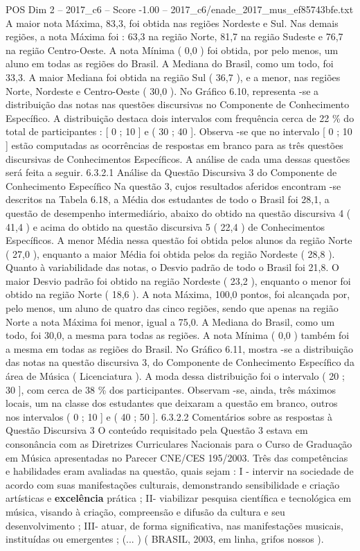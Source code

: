\begin{textsample}{POS Dim 2 – 2017\_c6 – Score -1.00 – 2017\_c6/enade\_2017\_mus\_ef85743bfe.txt}
A maior nota Máxima, 83,3, foi obtida nas regiões Nordeste e Sul.
Nas demais regiões, a nota Máxima foi : 63,3 na região Norte, 81,7 na região Sudeste e 76,7 na região Centro-Oeste.
A nota Mínima ( 0,0 ) foi obtida, por pelo menos, um aluno em todas as regiões do Brasil.
A Mediana do Brasil, como um todo, foi 33,3.
A maior Mediana foi obtida na região Sul ( 36,7 ), e a menor, nas regiões Norte, Nordeste e Centro-Oeste ( 30,0 ).
No Gráfico 6.10, representa -se a distribuição das notas nas questões discursivas no Componente de Conhecimento Específico.
A distribuição destaca dois intervalos com frequência cerca de 22 \% do total de participantes : [ 0 ; 10 ] e ( 30 ; 40 ].
Observa -se que no intervalo [ 0 ; 10 ] estão computadas as ocorrências de respostas em branco para as três questões discursivas de Conhecimentos Específicos.
A análise de cada uma dessas questões será feita a seguir. 6.3.2.1 Análise da Questão Discursiva 3 do Componente de Conhecimento Específico Na questão 3, cujos resultados aferidos encontram -se descritos na Tabela 6.18, a Média dos estudantes de todo o Brasil foi 28,1, a questão de desempenho intermediário, abaixo do obtido na questão discursiva 4 ( 41,4 ) e acima do obtido na questão discursiva 5 ( 22,4 ) de Conhecimentos Específicos.
A menor Média nessa questão foi obtida pelos alunos da região Norte ( 27,0 ), enquanto a maior Média foi obtida pelos da região Nordeste ( 28,8 ).
Quanto à variabilidade das notas, o Desvio padrão de todo o Brasil foi 21,8.
O maior Desvio padrão foi obtido na região Nordeste ( 23,2 ), enquanto o menor foi obtido na região Norte ( 18,6 ).
A nota Máxima, 100,0 pontos, foi alcançada por, pelo menos, um aluno de quatro das cinco regiões, sendo que apenas na região Norte a nota Máxima foi menor, igual a 75,0.
A Mediana do Brasil, como um todo, foi 30,0, a mesma para todas as regiões.
A nota Mínima ( 0,0 ) também foi a mesma em todas as regiões do Brasil.
No Gráfico 6.11, mostra -se a distribuição das notas na questão discursiva 3, do Componente de Conhecimento Específico da área de Música ( Licenciatura ).
A moda dessa distribuição foi o intervalo ( 20 ; 30 ], com cerca de 38 \% dos participantes.
Observam -se, ainda, três máximos locais, um na classe dos estudantes que deixaram a questão em branco, outros nos intervalos ( 0 ; 10 ] e ( 40 ; 50 ]. 6.3.2.2 Comentários sobre as respostas à Questão Discursiva 3 O conteúdo requisitado pela Questão 3 estava em consonância com as Diretrizes Curriculares Nacionais para o Curso de Graduação em Música apresentadas no Parecer CNE/CES 195/2003.
Três das competências e habilidades eram avaliadas na questão, quais sejam : I - intervir na sociedade de acordo com suas manifestações culturais, demonstrando sensibilidade e criação artísticas e \textbf{excelência} prática ; II- viabilizar pesquisa científica e tecnológica em música, visando à criação, compreensão e difusão da cultura e seu desenvolvimento ; III- atuar, de forma significativa, nas manifestações musicais, instituídas ou emergentes ; (... ) ( BRASIL, 2003, em linha, grifos nossos ).

\end{textsample}
